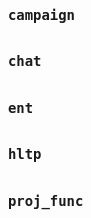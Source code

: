 \documentclass{article}
\theoremstyle{remark}
\begin{document}
\subsubsection{\texttt{campaign}}

\subsubsection{\texttt{chat}}

\subsubsection{\texttt{ent}}

\subsubsection{\texttt{hltp}}

\subsubsection{\texttt{proj\_func}}
\end{document}
